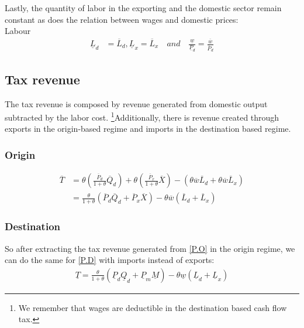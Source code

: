 Lastly, the quantity of labor in the exporting and the domestic sector remain constant as does the relation between wages and domestic prices: \\
\noindent Labour
\begin{equation}\label{P.L}
\begin{aligned}
\underline L_d &= \overline L_d, \underline L_x = \overline L_x \quad and \quad \frac{\underline w}{\underline P_d} = \frac{\overline w}{\overline P_d}
\end{aligned}
\end{equation}

\subsection*{Tax revenue}
The tax revenue is composed by revenue generated from domestic output subtracted by the labor cost. \footnote{We remember that wages are deductible in the destination based cash flow tax.}Additionally, there is revenue created through exports in the origin-based regime and imports in the destination based regime.  
\subsubsection*{Origin} 
\begin{equation}\label{t.o}
\begin{aligned}
\overline T &= \theta \left(\frac{\overline P_d}{1+\theta}\overline Q_d \right ) + \theta \left(\frac{\overline P_x}{1+\theta}\overline X\right ) - \left( \theta \overline w \overline L_d + \theta \overline w \overline L_x\right ) \\ &= \frac{\theta}{1+\theta} \left(  \overline P_d \overline Q_d +  \overline P_x \overline X \right)  - \theta \overline w  \left( \overline L_d + \overline L_x \right) 
\end{aligned} 
\end{equation}

\subsubsection*{Destination}
So after extracting the tax revenue generated from \eqref{P.O} in the origin regime, we can do the same for \eqref{P.D} with imports instead of exports: 
\begin{equation}\label{t.d}
\begin{aligned}
\underline T =%
 \frac{\theta}{1+\theta} \left(  \underline P_d \underline Q_d + \underline P_m \underline M   \right) - \theta \underline w  \left( \underline L_d + \underline L_x \right) 
\end{aligned} 
\end{equation}


